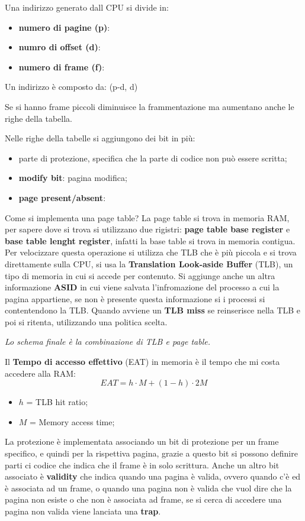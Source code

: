 \documentclass[12pt]{article}
\begin{document}
Una indirizzo generato dall CPU si divide in:
\begin{itemize}
  \item \textbf{numero di pagine (p)}: 
  \item \textbf{numro di offset (d)}:
  \item \textbf{numero di frame (f)}:
\end{itemize}
Un indirizzo \`e composto da: (p-d, d)
\begin{example}{}{}
  Se si hanno frame piccoli diminuisce la frammentazione ma aumentano anche le righe della tabella.
\end{example}
Nelle righe della tabelle si aggiungono dei bit in pi\`u:
\begin{itemize}
  \item parte di protezione, specifica che la parte di codice non pu\`o essere scritta;
  \item \textbf{modify bit}: pagina modifica;
  \item \textbf{page present/absent}: 
\end{itemize}
Come si implementa una page table? La page table si trova in memoria RAM, per sapere dove si trova si utilizzano due rigistri: \textbf{page table base register} e \textbf{base table lenght register}, infatti la base table si trova in memoria contigua. Per velocizzare questa operazione si utilizza che TLB che \`e pi\`u piccola e si trova direttamente sulla CPU, si usa la \textbf{Translation Look-aside Buffer} (TLB), un tipo di memoria in cui si accede per contenuto. Si aggiunge anche un altra informazione \textbf{ASID} in cui viene salvata l'infromazione del processo a cui la pagina appartiene, se non \`e presente questa informazione si i processi si contentendono la TLB. Quando avviene un \textbf{TLB miss} se reinserisce nella TLB e poi si ritenta, utilizzando una politica scelta.
\begin{center}
  \emph{Lo schema finale \`e la combinazione di TLB e page table.}
\end{center}
Il \textbf{Tempo di accesso effettivo} (EAT) in memoria \`e il tempo che mi costa accedere alla RAM:
\[ EAT = h \cdot M + (1 - h) \cdot 2M  \]
\begin{itemize}
  \item $h$ = TLB hit ratio;
  \item $M$ = Memory access time;
\end{itemize}
La protezione \`e implementata associando un bit di protezione per un frame specifico, e quindi per la rispettiva pagina, grazie a questo bit si possono definire parti ci codice che indica che il frame \`e in solo scrittura. Anche un altro bit associato \`e \textbf{validity} che indica quando una pagina \`e valida, ovvero quando c'\`e ed \`e associata ad un frame, o quando una pagina non \`e valida che vuol dire che la pagina non esiste o che non \`e associata ad frame, se si cerca di accedere una pagina non valida viene lanciata una \textbf{trap}.
\end{document}
